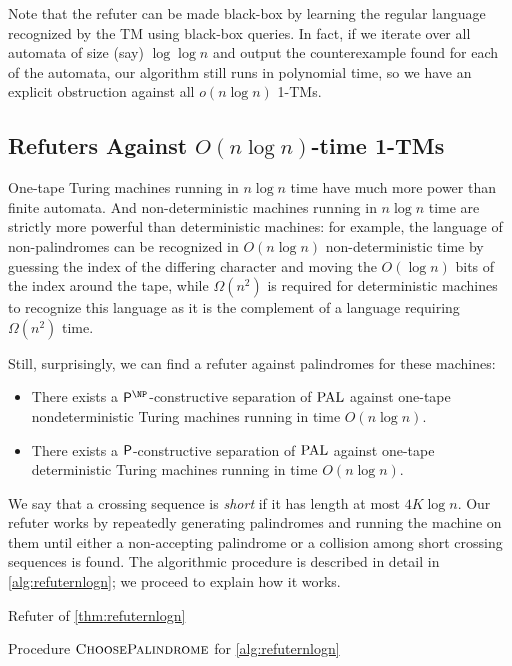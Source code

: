 Note that the refuter can be made black-box by learning the regular language recognized by the TM using black-box queries. 
In fact, if we iterate over all automata of size (say) $\log \log n$ and output the counterexample found for each of the
automata, our algorithm still runs in polynomial time, so we have an explicit obstruction against all $o(n \log n)$ 1-TMs. 

\subsection{Refuters Against $O(n \log n)$-time 1-TMs}

One-tape Turing machines running in $n \log n$ time have much more power than finite automata. And non-deterministic machines running in $n \log n$ time
are strictly more powerful than deterministic machines: for example, the language of non-palindromes can be recognized in $O(n \log n)$
non-deterministic time by guessing the index of the differing character and moving the $O(\log n)$ bits of the index around the tape,
while $\Omega(n^2)$ is required for deterministic machines to recognize this language as it is the complement of a language requiring $\Omega(n^2)$
time. 

Still, surprisingly, we can find a refuter against palindromes for these machines:

\begin{theorem}
    \label{thm:refuternlogn}

    \begin{itemize}
        \item There exists a $\PTIME^\NP$-constructive separation of $\mathrm{PAL}$ against one-tape nondeterministic Turing machines running in time $O(n \log n)$.
        \item There exists a $\mathsf{P}$-constructive separation of $\mathrm{PAL}$ against one-tape deterministic Turing machines running in time $O(n \log n)$.
    \end{itemize}
\end{theorem}


We say that a crossing sequence is \emph{short} if it has length at most $4K \log n$. Our refuter works by repeatedly generating palindromes
and running the machine on them until either a non-accepting palindrome or a collision among short crossing sequences is found. The algorithmic
procedure is described in detail in \cref{alg:refuternlogn}; we proceed to explain how it works. 

\begin{algorithm}
    \caption{Refuter of \cref{thm:refuternlogn}}\label{alg:refuternlogn}
    \begin{algorithmic}
    
    \end{algorithmic}
\end{algorithm}
\begin{algorithm}
    \caption{Procedure $\textsc{ChoosePalindrome}$ for \cref{alg:refuternlogn}}\label{alg:choosepalindrome}
    \begin{algorithmic}
    
    \end{algorithmic}
\end{algorithm}

